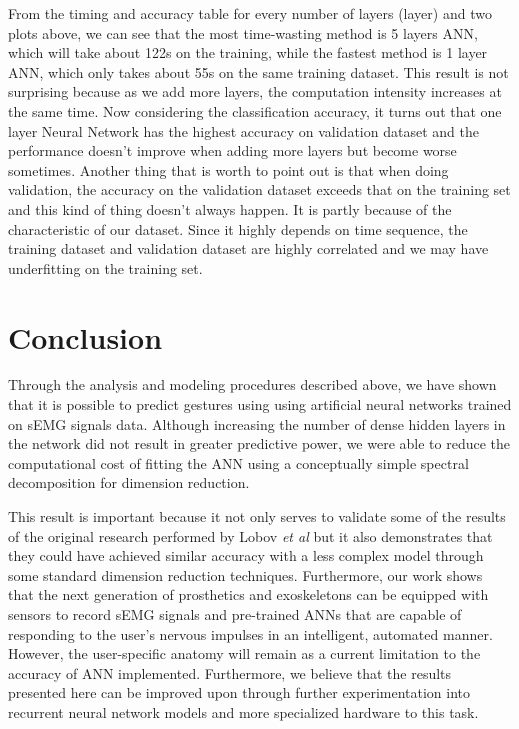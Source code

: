 \documentclass{article}
\begin{document}
From the timing and accuracy table for every number of layers (layer) and two plots above, we can see that the most time-wasting method is 5 layers ANN, which will take about 122s on the training, while the fastest method is 1 layer ANN, which only takes about 55s on the same training dataset. This result is not surprising because as we add more layers, the computation intensity increases at the same time. \newline
Now considering the classification accuracy, it turns out that one layer Neural Network has the highest accuracy on validation dataset and the performance doesn't improve when adding more layers but become worse sometimes.\newline
Another thing that is worth to point out is that when doing validation, the accuracy on the validation dataset exceeds that on the training set and this kind of thing doesn't always happen. It is partly because of the characteristic of our dataset. Since it highly depends on time sequence, the training dataset and validation dataset are highly correlated and we may have underfitting on the training set.


\section{Conclusion}
Through the analysis and modeling procedures described above, we have shown that it is possible to predict gestures using using artificial neural networks trained on sEMG signals data. Although increasing the number of dense hidden layers in the network did not result in greater predictive power, we were able to reduce the computational cost of fitting the ANN using a conceptually simple spectral decomposition for dimension reduction.

This result is important because it not only serves to validate some of the results of the original research performed by Lobov \textit{et al} but it also demonstrates that they could have achieved similar accuracy with a less complex model through some standard dimension reduction techniques. Furthermore, our work shows that the next generation of prosthetics and exoskeletons can be equipped with sensors to record sEMG signals and pre-trained ANNs that are capable of responding to the user's nervous impulses in an intelligent, automated manner. However, the user-specific anatomy will remain as a current limitation to the accuracy of ANN implemented. Furthermore, we believe that the results presented here can be improved upon through further experimentation into recurrent neural network models and  more specialized hardware to this task.




\newpage








\end{document}
